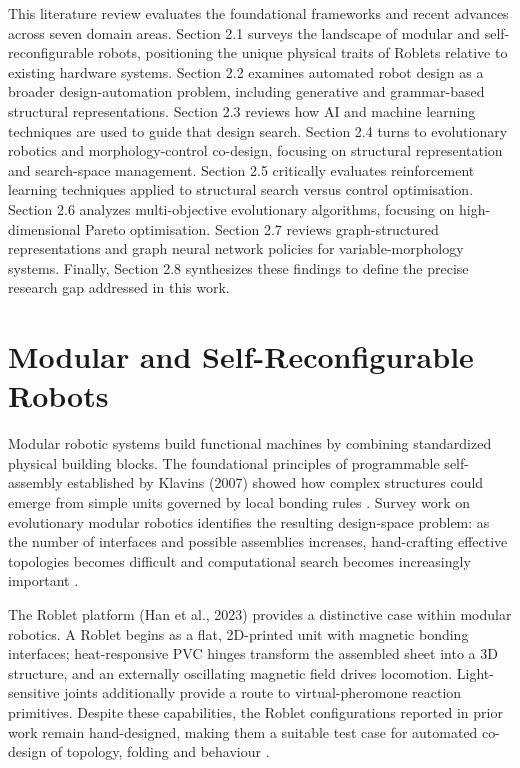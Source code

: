 \documentclass[12pt,a4paper]{report}
\begin{document}
This literature review evaluates the foundational frameworks and recent advances across seven domain areas. Section 2.1 surveys the landscape of modular and self-reconfigurable robots, positioning the unique physical traits of Roblets relative to existing hardware systems. Section 2.2 examines automated robot design as a broader design-automation problem, including generative and grammar-based structural representations. Section 2.3 reviews how AI and machine learning techniques are used to guide that design search. Section 2.4 turns to evolutionary robotics and morphology-control co-design, focusing on structural representation and search-space management. Section 2.5 critically evaluates reinforcement learning techniques applied to structural search versus control optimisation. Section 2.6 analyzes multi-objective evolutionary algorithms, focusing on high-dimensional Pareto optimisation. Section 2.7 reviews graph-structured representations and graph neural network policies for variable-morphology systems. Finally, Section 2.8 synthesizes these findings to define the precise research gap addressed in this work.

\section{Modular and Self-Reconfigurable Robots}
Modular robotic systems build functional machines by combining standardized physical building blocks. The foundational principles of programmable self-assembly established by Klavins (2007) showed how complex structures could emerge from simple units governed by local bonding rules \citep{4272328}. Survey work on evolutionary modular robotics identifies the resulting design-space problem: as the number of interfaces and possible assemblies increases, hand-crafting effective topologies becomes difficult and computational search becomes increasingly important \citep{alattas2019evolutionary}.

The Roblet platform (Han et al., 2023) provides a distinctive case within modular robotics. A Roblet begins as a flat, 2D-printed unit with magnetic bonding interfaces; heat-responsive PVC hinges transform the assembled sheet into a 3D structure, and an externally oscillating magnetic field drives locomotion. Light-sensitive joints additionally provide a route to virtual-pheromone reaction primitives. Despite these capabilities, the Roblet configurations reported in prior work remain hand-designed, making them a suitable test case for automated co-design of topology, folding and behaviour \citep{han2023roblets}.
\end{document}
